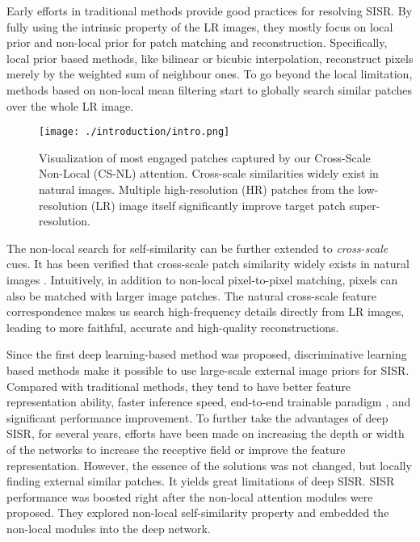 \documentclass[10pt,twocolumn,letterpaper]{article}
\begin{document}
Early efforts in traditional methods provide good practices for resolving SISR. By fully using the intrinsic property of the LR images, they mostly focus on local prior and non-local prior for patch matching and reconstruction. Specifically, local prior based methods, like bilinear or bicubic interpolation, reconstruct pixels merely by the weighted sum of neighbour ones. To go beyond the local limitation, methods based on non-local mean filtering \cite{protter2008generalizing, zhang2012single} start to globally search similar patches over the whole LR image. 

\begin{figure}[t]
    \centering
      \texttt{[image: ./introduction/intro.png]}
\caption{Visualization of most engaged patches captured by our Cross-Scale Non-Local (CS-NL) attention. Cross-scale similarities widely exist in natural images. Multiple high-resolution (HR) patches from the low-resolution (LR) image itself significantly improve target patch super-resolution.}
    \label{fig:match}
\end{figure}
The non-local search for self-similarity can be further extended to \textit{cross-scale} cues. It has been verified that cross-scale patch similarity widely exists in natural images \cite{glasner2009super,zontak2011internal}. Intuitively, in addition to non-local pixel-to-pixel matching, pixels can also be matched with larger image patches. The natural cross-scale feature correspondence makes us search high-frequency details directly from LR images, leading to more faithful, accurate and high-quality reconstructions.








Since the first deep learning-based method \cite{dong2014learning} was proposed, discriminative learning based methods make it possible to use large-scale external image priors for SISR. Compared with traditional methods, they tend to have better feature representation ability, faster inference speed, end-to-end trainable paradigm \cite{goodfellow2016deep,krizhevsky2012imagenet}, and significant performance improvement. To further take the advantages of deep SISR, for several years, efforts \cite{ fan2017balanced, kim2016accurate,lim2017enhanced,zhang2018image,zhang2018residual,yu2018wide,fan2019scale} have been made on increasing the depth or width of the networks to increase the receptive field or improve the feature representation. However, the essence of the solutions was not changed, but locally finding external similar patches. It yields great limitations of deep SISR. SISR performance was boosted right after the non-local attention modules  \cite{dai2019second,liu2018non,zhang2019residual} were proposed. They explored non-local self-similarity property and embedded the non-local modules into the deep network.
\end{document}
